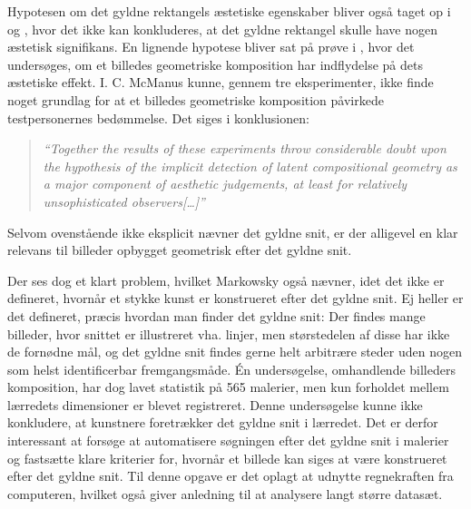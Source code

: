 {Hypotesen om det gyldne rektangels æstetiske egenskaber bliver også
taget op i \cite{Boselie1984} og \cite{Plug1980}, hvor det ikke kan
konkluderes, at det gyldne rektangel skulle have nogen æstetisk
signifikans. En lignende hypotese bliver sat på prøve i
\cite{McManus1995}, hvor det undersøges, om et billedes geometriske
komposition har indflydelse på dets æstetiske effekt. I. C. McManus
kunne, gennem tre eksperimenter, ikke finde noget grundlag for at et
billedes geometriske komposition påvirkede testpersonernes bedømmelse.
Det siges i konklusionen:

\begin{quote}
	\emph{``Together the results of these experiments throw
	considerable doubt upon the hypothesis of the implicit detection
	of latent compositional geometry as a major component of
	aesthetic judgements, at least for relatively unsophisticated
	observers[\dots]''}
\end{quote}

Selvom ovenstående ikke eksplicit nævner det gyldne snit, er der
alligevel en klar relevans til billeder opbygget geometrisk efter det
gyldne snit.

Der ses dog et klart problem, hvilket Markowsky også nævner, idet det
ikke er defineret, hvornår et stykke kunst er konstrueret efter det
gyldne snit. Ej heller er det defineret, præcis hvordan man finder det
gyldne snit: Der findes mange billeder, hvor snittet er illustreret vha.
linjer, men størstedelen af disse har ikke de fornødne mål, og det
gyldne snit findes gerne helt arbitrære steder uden nogen som helst
identificerbar fremgangsmåde.  Én undersøgelse, omhandlende billeders
komposition, har dog lavet statistik på 565 malerier, men kun forholdet
mellem lærredets dimensioner er blevet registreret\cite{Olariu1999}.
Denne undersøgelse kunne ikke konkludere, at kunstnere foretrækker det
gyldne snit i lærredet. Det er derfor interessant at forsøge at
automatisere søgningen efter det gyldne snit i malerier og fastsætte
klare kriterier for, hvornår et billede kan siges at være konstrueret
efter det gyldne snit.  Til denne opgave er det oplagt at udnytte
regnekraften fra computeren, hvilket også giver anledning til  at
analysere langt større datasæt.

}
